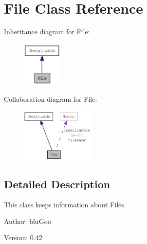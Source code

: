 \hypertarget{classFile}{
\section{File Class Reference}
\label{classFile}
}
Inheritance diagram for File:\nopagebreak
\begin{figure}[H]
\begin{center}
\leavevmode
\includegraphics[width=58pt]{classFile__inherit__graph}
\end{center}
\end{figure}
Collaboration diagram for File:\nopagebreak
\begin{figure}[H]
\begin{center}
\leavevmode
\includegraphics[width=105pt]{classFile__coll__graph}
\end{center}
\end{figure}


\subsection{Detailed Description}
This class keeps information about Files. 

\begin{Desc}
\item[Author:]bluGoo \end{Desc}
\begin{Desc}
\item[Version:]0.42 \end{Desc}


